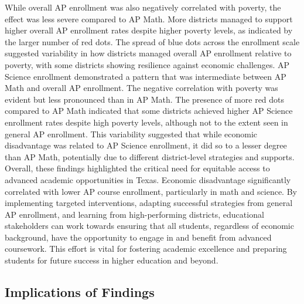 \documentclass[sn-mathphys-num]{sn-jnl}%
\theoremstyle{thmstyleone}%
\theoremstyle{thmstyletwo}%
\theoremstyle{thmstylethree}%
\begin{document}
{While overall AP enrollment was also negatively correlated with poverty, the effect was less severe compared to AP Math. More districts managed to support higher overall AP enrollment rates despite higher poverty levels, as indicated by the larger number of red dots. The spread of blue dots across the enrollment scale suggested variability in how districts managed overall AP enrollment relative to poverty, with some districts showing resilience against economic challenges. AP Science enrollment demonstrated a pattern that was intermediate between AP Math and overall AP enrollment. The negative correlation with poverty was evident but less pronounced than in AP Math. The presence of more red dots compared to AP Math indicated that some districts achieved higher AP Science enrollment rates despite high poverty levels, although not to the extent seen in general AP enrollment. This variability suggested that while economic disadvantage was related to AP Science enrollment, it did so to a lesser degree than AP Math, potentially due to different district-level strategies and supports.\\

Overall, these findings highlighted the critical need for equitable access to advanced academic opportunities in Texas. Economic disadvantage significantly correlated with lower AP course enrollment, particularly in math and science. By implementing targeted interventions, adapting successful strategies from general AP enrollment, and learning from high-performing districts, educational stakeholders can work towards ensuring that all students, regardless of economic background, have the opportunity to engage in and benefit from advanced coursework. This effort is vital for fostering academic excellence and preparing students for future success in higher education and beyond.\\

\subsection{Implications of Findings}

}
\end{document}
